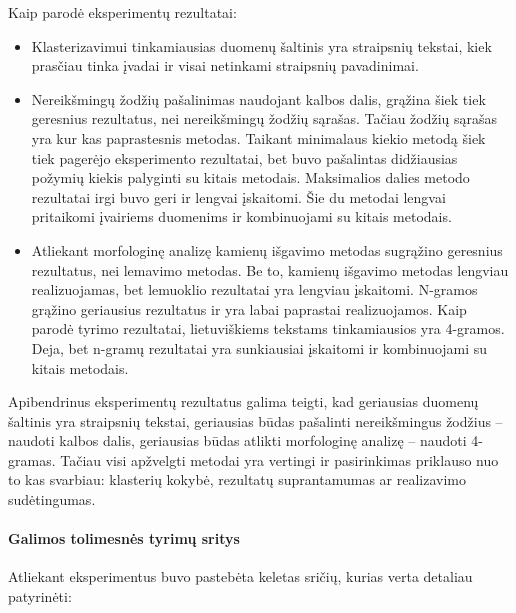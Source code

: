 \documentclass{VUMIFInfBakalaurinis}
\providecommand{\tightlist}{%
	  \setlength{\itemsep}{0pt}\setlength{\parskip}{0pt}}
\begin{document}
Kaip parodė eksperimentų rezultatai:

\begin{itemize}
\tightlist
\item
  Klasterizavimui tinkamiausias duomenų šaltinis yra straipsnių tekstai,
  kiek prasčiau tinka įvadai ir visai netinkami straipsnių pavadinimai.
\item
  Nereikšmingų žodžių pašalinimas naudojant kalbos dalis, grąžina šiek
  tiek geresnius rezultatus, nei nereikšmingų žodžių sąrašas. Tačiau
  žodžių sąrašas yra kur kas paprastesnis metodas. Taikant minimalaus kiekio
  metodą šiek tiek pagerėjo eksperimento rezultatai, bet buvo pašalintas didžiausias požymių
  kiekis palyginti su kitais metodais. Maksimalios dalies metodo rezultatai
  irgi buvo geri ir lengvai įskaitomi. Šie du metodai lengvai pritaikomi
  įvairiems duomenims ir kombinuojami su kitais metodais.
\item
  Atliekant morfologinę analizę kamienų išgavimo metodas sugrąžino
  geresnius rezultatus, nei lemavimo metodas. Be to, kamienų išgavimo
  metodas lengviau realizuojamas, bet lemuoklio rezultatai yra lengviau
  įskaitomi. N-gramos grąžino geriausius rezultatus ir yra labai
  paprastai realizuojamos. Kaip parodė tyrimo rezultatai, lietuviškiems
  tekstams tinkamiausios yra 4-gramos. Deja, bet n-gramų rezultatai yra
  sunkiausiai įskaitomi ir kombinuojami su kitais metodais.
\end{itemize}

Apibendrinus eksperimentų rezultatus galima teigti, kad geriausias
duomenų šaltinis yra straipsnių tekstai, geriausias būdas pašalinti
nereikšmingus žodžius -- naudoti kalbos dalis, geriausias būdas atlikti
morfologinę analizę -- naudoti 4-gramas. Tačiau visi apžvelgti metodai
yra vertingi ir pasirinkimas priklauso nuo to kas svarbiau: klasterių
kokybė, rezultatų suprantamumas ar realizavimo sudėtingumas.

\paragraph{Galimos tolimesnės tyrimų sritys}

Atliekant eksperimentus buvo pastebėta keletas sričių, kurias verta
detaliau patyrinėti:
\end{document}
